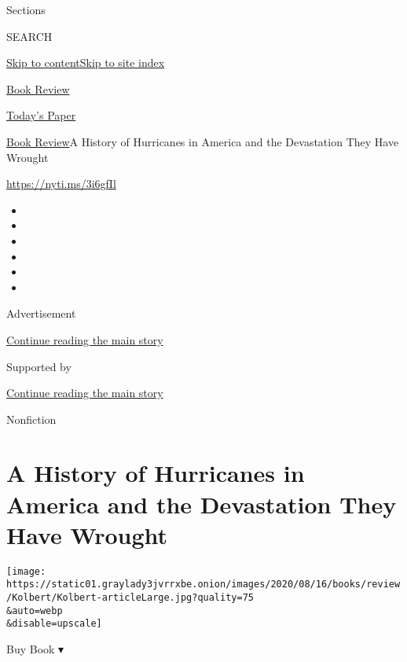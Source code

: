 Sections

SEARCH

\protect\hyperlink{site-content}{Skip to
content}\protect\hyperlink{site-index}{Skip to site index}

\href{https://www.nytimes3xbfgragh.onion/section/books/review}{Book
Review}

\href{https://myaccount.nytimes3xbfgragh.onion/auth/login?response_type=cookie\&client_id=vi}{}

\href{https://www.nytimes3xbfgragh.onion/section/todayspaper}{Today's
Paper}

\href{/section/books/review}{Book Review}\textbar{}A History of
Hurricanes in America and the Devastation They Have Wrought

\url{https://nyti.ms/3i6gfIl}

\begin{itemize}
\item
\item
\item
\item
\item
\item
\end{itemize}

Advertisement

\protect\hyperlink{after-top}{Continue reading the main story}

Supported by

\protect\hyperlink{after-sponsor}{Continue reading the main story}

Nonfiction

\hypertarget{a-history-of-hurricanes-in-america-and-the-devastation-they-have-wrought}{%
\section{A History of Hurricanes in America and the Devastation They
Have
Wrought}\label{a-history-of-hurricanes-in-america-and-the-devastation-they-have-wrought}}

\texttt{[image: https://static01.graylady3jvrrxbe.onion/images/2020/08/16/books/review/Kolbert/Kolbert-articleLarge.jpg?quality=75\\\&auto=webp\\\&disable=upscale]}

Buy Book ▾

